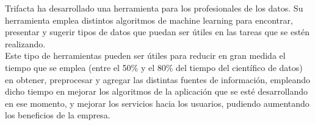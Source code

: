 \documentclass[12pt,a4paper,twoside,openright,titlepage,final]{article}
\begin{document}
Trifacta ha desarrollado una herramienta para los profesionales de los datos. Su herramienta emplea distintos algoritmos de machine learning para encontrar, presentar y sugerir tipos de datos que puedan ser útiles en las tareas que se estén realizando.\\

Este tipo de herramientas pueden ser útiles para reducir en gran medida el tiempo que se emplea (entre el 50\% y el 80\% del tiempo del científico de datos) en obtener, preprocesar y agregar las distintas fuentes de información, empleando dicho tiempo en mejorar los algoritmos de la aplicación que se esté desarrollando en ese momento, y mejorar los servicios hacia los usuarios, pudiendo aumentando los beneficios de la empresa. 
\end{document}
